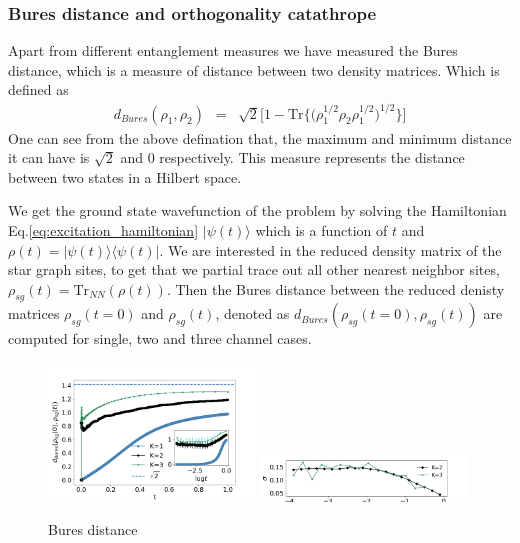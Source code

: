 \documentclass[reprint,prb,superscriptaddress]{revtex4-2}
\begin{document}
\subsubsection{Bures distance and orthogonality catathrope}
\noindent Apart from different entanglement measures we have measured the Bures distance, which is a measure of distance between two density matrices. Which is defined as 
\begin{eqnarray}
d_{Bures}(\rho_1,\rho_2) &=& \sqrt{2} \bigg[1- \textrm{Tr}\bigg\{ \bigg(\rho_1^{1/2}  \rho_2 \rho_{1}^{1/2}\bigg)^{1/2} \bigg\}\bigg]
\end{eqnarray}
One can see from the above defination that, the maximum and minimum distance it can have is $\sqrt{2}$ and $0$ respectively. This measure represents the distance between two states in a Hilbert space. 
\par We get the ground state wavefunction of the problem by solving the Hamiltonian Eq.\eqref{eq:excitation_hamiltonian} $|\psi(t)\rangle$ which is a function of $t$ and $\rho(t)= |\psi(t)\rangle \langle \psi(t)|$. We are interested in the reduced density matrix of the star graph sites, to get that we partial trace out all other nearest neighbor sites, $\rho_{sg}(t)=\textrm{Tr}_{NN}(\rho(t))$. Then the Bures distance between the reduced denisty matrices $\rho_{sg}(t=0)$ and $\rho_{sg}(t)$, denoted as $d_{Bures}(\rho_{sg}(t=0),\rho_{sg}(t))$ are computed for single, two and three channel cases.
\begin{figure}[!htpb]
\includegraphics[width=0.49\textwidth]{plt/error_Bures_Distance_Ch123_10001}
\includegraphics[width=0.49\textwidth]{plt/errorbar_Bures_Distance_Ch123_10001}
\caption{Bures distance}
\label{fig:bures_distance}
\end{figure}
\end{document}
